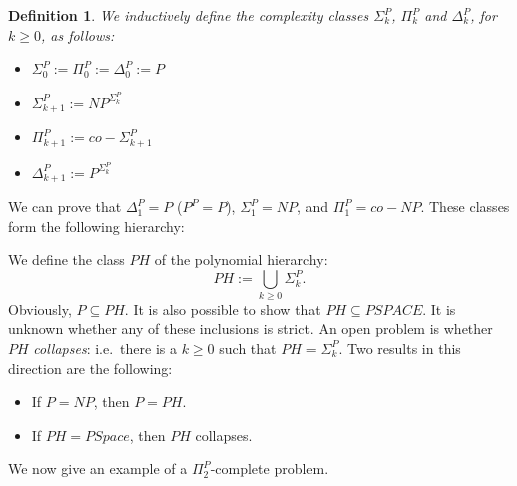 \documentclass{report}
\newcommand{\NP}{\text{$\mathit{NP}$}\xspace}
\newcommand{\Po}{\text{$\mathit{P}$}\xspace}
\newtheorem{definition}{Definition}[chapter]
\begin{document}
\begin{definition} We inductively define the complexity classes $\Sigma_k^\Po$, $\Pi_k^\Po$ and $\Delta_k^\Po$, for $k \geq 0$, as follows:
\begin{itemize}
 \item $\Sigma_0^\Po := \Pi_0^\Po := \Delta_0^\Po := P$
 \item $\Sigma_{k+1}^\Po := \NP^{\Sigma_k^\Po}$ 
 \item $\Pi_{k+1}^\Po := co-\Sigma_{k+1}^\Po$
 \item $\Delta_{k+1}^\Po := \Po^{\Sigma_k^\Po}$
\end{itemize}
\end{definition}

We can prove that $\Delta_1^\Po = \Po$ ($\Po^\Po = \Po$), $\Sigma_1^\Po = \NP$, and $\Pi_1^\Po = co-\NP$. These classes form the following hierarchy:
\begin{figure}[!ht]
\newcommand{\hdiff}{4em}
\newcommand{\vdiff}{2em}
\centering
{}
\end{figure}

We define the class $PH$ of the polynomial hierarchy: 
\[PH := \bigcup_{k \geq 0} \Sigma_k^\Po.\]
Obviously, $\Po \subseteq PH$. It is also possible to show that $PH \subseteq PSPACE$. It is unknown whether any of these inclusions is strict. An open problem is whether $PH$ \emph{collapses}: i.e.\, there is a $k \geq 0$ such that $PH = \Sigma_k^\Po$. Two results in this direction are the following:
\begin{itemize}
 \item If $\Po = \NP$, then $\Po = PH$.
 \item If $PH = PSpace$, then $PH$ collapses. 
\end{itemize}
We now give an example of a $\Pi_2^\Po$-complete problem. 
\end{document}
